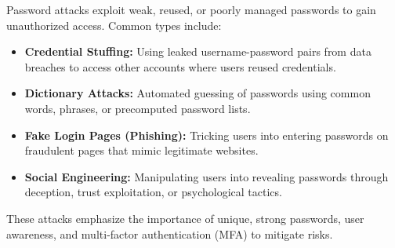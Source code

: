 \begin{theo}
    
    \label{theo:password_attacks}  
    Password attacks exploit weak, reused, or poorly managed passwords to gain unauthorized access. Common types include:  
    
    \begin{itemize}  
        \item \textbf{Credential Stuffing:} Using leaked username-password pairs from data breaches to access other accounts where users reused credentials.  
        \item \textbf{Dictionary Attacks:} Automated guessing of passwords using common words, phrases, or precomputed password lists.  
        \item \textbf{Fake Login Pages (Phishing):} Tricking users into entering passwords on fraudulent pages that mimic legitimate websites.  
        \item \textbf{Social Engineering:} Manipulating users into revealing passwords through deception, trust exploitation, or psychological tactics.  
    \end{itemize}  
    
    These attacks emphasize the importance of unique, strong passwords, user awareness, and multi-factor authentication (MFA) to mitigate risks.  
    
\end{theo}
    